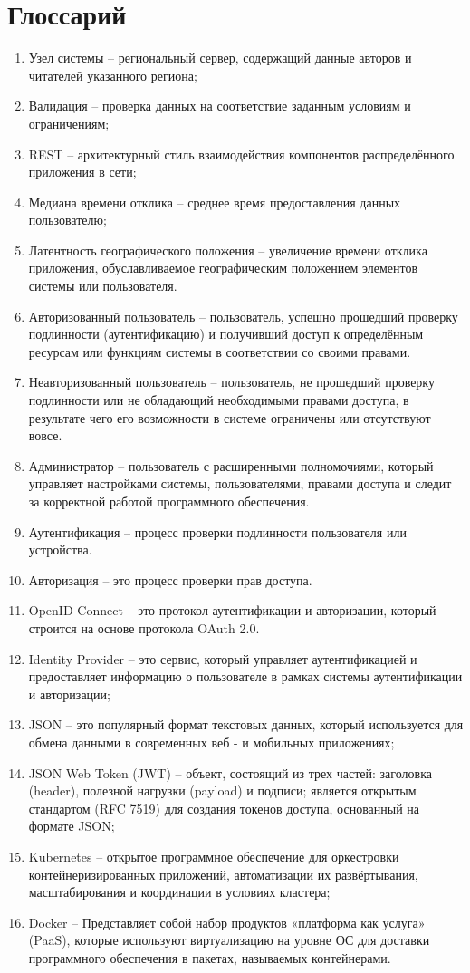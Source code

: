 \section*{Глоссарий}

\begin{enumerate}
	\item Узел системы -- региональный сервер, содержащий данные авторов и читателей указанного региона;
	\item Валидация -- проверка данных на соответствие заданным условиям и ограничениям;
	\item REST -- архитектурный стиль взаимодействия компонентов распределённого
	приложения в сети;
	\item Медиана времени отклика -- среднее время предоставления данных пользователю;
	\item Латентность географического положения -- увеличение времени отклика приложения, обуславливаемое географическим положением элементов системы или
	пользователя.
    \item Авторизованный пользователь -- пользователь, успешно прошедший проверку подлинности (аутентификацию) и получивший доступ к определённым ресурсам или функциям системы в соответствии со своими правами.
    \item Неавторизованный пользователь -- пользователь, не прошедший проверку подлинности или не обладающий необходимыми правами доступа, в результате чего его возможности в системе ограничены или отсутствуют вовсе.
    \item Администратор -- пользователь с расширенными полномочиями, который управляет настройками системы, пользователями, правами доступа и следит за корректной работой программного обеспечения.
	\item Аутентификация -- процесс проверки подлинности пользователя или устройства.
	\item Авторизация -- это процесс проверки прав доступа.
	\item OpenID Connect -- это протокол аутентификации и авторизации, который строится на основе протокола OAuth 2.0.
	\item Identity Provider -- это сервис, который управляет аутентификацией и предоставляет информацию о пользователе в рамках системы аутентификации и авторизации;
    \item JSON -- это популярный формат текстовых данных, который используется для обмена данными в современных веб - и мобильных приложениях;
    \item JSON Web Token (JWT) -- объект, состоящий из трех частей: заголовка (header), полезной нагрузки (payload) и подписи; является открытым стандартом (RFC 7519) для создания токенов доступа, основанный на формате JSON;
    \item Kubernetes -- открытое программное обеспечение для оркестровки контейнеризированных приложений, автоматизации их развёртывания, масштабирования и координации в условиях кластера;
    \item Docker -- Представляет собой набор продуктов «платформа как услуга» (PaaS), которые используют виртуализацию на уровне ОС для доставки программного обеспечения в пакетах, называемых контейнерами.
\end{enumerate}
